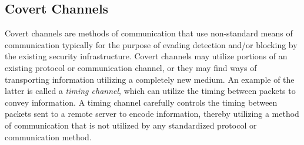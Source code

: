 \documentclass{llncs}
\begin{document}
%
%

\subsection{Covert Channels}

Covert channels are methods of communication that use non-standard means of
communication typically for the purpose of evading detection and/or blocking by the
existing security infrastructure. Covert channels may utilize portions of an
existing protocol\cite{Born2010.psudp} or communication channel, or they may
find ways of transporting information utilizing a completely new medium. An
example of the latter is called a \emph{timing channel}\cite{Sellke2009}, which
can utilize the timing between packets to convey information. A timing channel
carefully controls the timing between packets sent to a remote server to encode
information, thereby utilizing a method of communication that is not utilized by
any standardized protocol or communication method.
\end{document}
